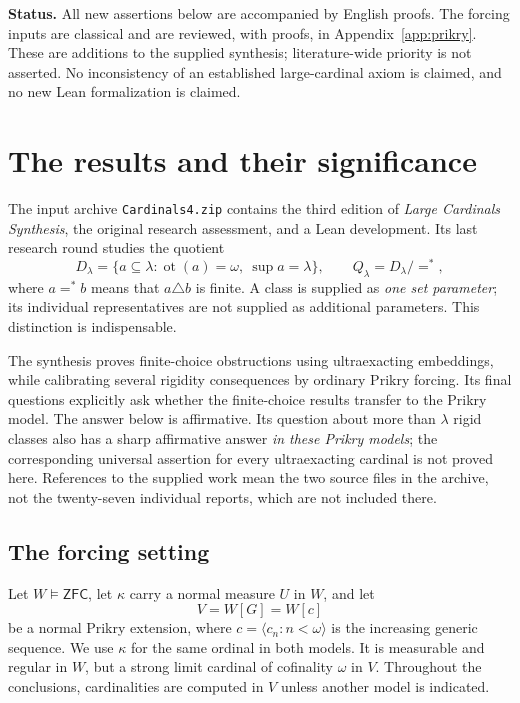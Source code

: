 \documentclass[11pt,letterpaper]{article}
\theoremstyle{definition}
\numberwithin{equation}{section}
\newcommand{\ZFC}{\mathsf{ZFC}}
\begin{document}
\textbf{Status.} All new assertions below are accompanied by English proofs. The forcing inputs are classical and are reviewed, with proofs, in Appendix~\ref{app:prikry}. These are additions to the supplied synthesis; literature-wide priority is not asserted. No inconsistency of an established large-cardinal axiom is claimed, and no new Lean formalization is claimed.

\clearpage
\tableofcontents
\clearpage

\section{The results and their significance}\label{sec:results}

The input archive \nolinkurl{Cardinals4.zip} contains the third edition of \emph{Large Cardinals Synthesis}, the original research assessment, and a Lean development. Its last research round studies the quotient
\[
 D_\lambda=\{a\subseteq\lambda:\operatorname{ot}(a)=\omega,\ \sup a=\lambda\},
 \qquad Q_\lambda=D_\lambda/{=^*},
\]
where $a=^*b$ means that $a\triangle b$ is finite. A class is supplied as \emph{one set parameter}; its individual representatives are not supplied as additional parameters. This distinction is indispensable.

The synthesis proves finite-choice obstructions using ultraexacting embeddings, while calibrating several rigidity consequences by ordinary Prikry forcing. Its final questions explicitly ask whether the finite-choice results transfer to the Prikry model. The answer below is affirmative. Its question about more than $\lambda$ rigid classes also has a sharp affirmative answer \emph{in these Prikry models}; the corresponding universal assertion for every ultraexacting cardinal is not proved here. References to the supplied work mean the two source files in the archive, not the twenty-seven individual reports, which are not included there.\cite{synthesis,plan}

\subsection{The forcing setting}

Let $W\models\ZFC$, let $\kappa$ carry a normal measure $U$ in $W$, and let
\[
 V=W[G]=W[c]
\]
be a normal Prikry extension, where $c=\langle c_n:n<\omega\rangle$ is the increasing generic sequence. We use $\kappa$ for the same ordinal in both models. It is measurable and regular in $W$, but a strong limit cardinal of cofinality $\omega$ in $V$. Throughout the conclusions, cardinalities are computed in $V$ unless another model is indicated.
\end{document}
